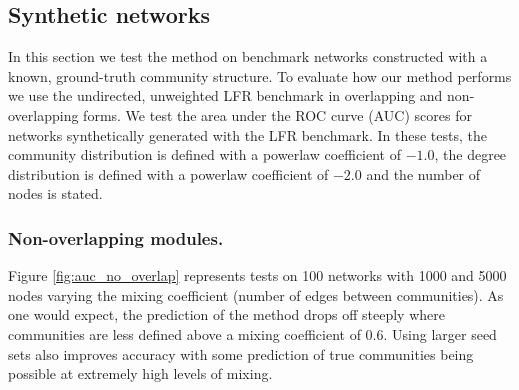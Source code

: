 \documentclass[sigconf]{acmart}
\begin{document}
\subsection{Synthetic networks}
In this section we test the method on benchmark networks constructed with a known, ground-truth community structure.
To evaluate how our method performs we use the undirected, unweighted LFR benchmark \cite{lancichinetti2008benchmark} in overlapping and non-overlapping forms.
We test the area under the ROC curve (AUC) scores for networks synthetically generated with the LFR benchmark.
In these tests, the community distribution is defined with a powerlaw coefficient of $-1.0$, the degree distribution is defined with a powerlaw coefficient of $-2.0$ and the number of nodes is stated.

\subsubsection{Non-overlapping modules.}
Figure \ref{fig:auc_no_overlap} represents tests on 100 networks with 1000 and 5000 nodes varying the mixing coefficient (number of edges between communities).
As one would expect, the prediction of the method drops off steeply where communities are less defined above a mixing coefficient of 0.6.
Using larger seed sets also improves accuracy with some prediction of true communities being possible at extremely high levels of mixing.
\end{document}
